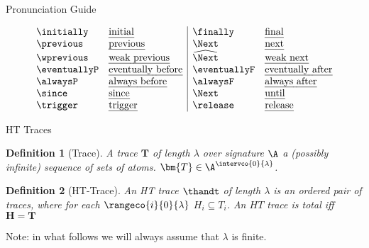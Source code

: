 \documentclass[aspectratio=169,xcolor=svgnames]{beamer}
\theoremstyle{theoremstyle_space}
\newtheorem{definition}{Definition}
\begin{document}
\begin{frame}[t]{Pronunciation Guide}

\[
  \begin{array}{l l|l l}
    \initially & \text{\emph{initial}} & \finally & \text{\emph{final}}\\
    \previous & \text{\emph{previous}} & \Next & \text{\emph{next}}\\
    \wprevious & \text{\emph{weak previous}} & \wnext & \text{\emph{weak next}}\\
    \eventuallyP & \text{\emph{eventually before}} & \eventuallyF & \text{\emph{eventually after}}\\
    \alwaysP & \text{\emph{always before}} & \alwaysF & \text{\emph{always after}}\\
    \since & \text{\emph{since}} & \Next & \text{\emph{until}}\\
    \trigger & \text{\emph{trigger}} & \release & \text{\emph{release}}
\end{array}
\]

\end{frame}

\begin{frame}[t]{HT Traces}

\begin{definition}[Trace]
  A trace $\bm{T}$ of length $\lambda$ over signature $\A$ a (possibly
  infinite) sequence of sets of atoms.
  $\bm{T} \in \A^{\intervco{0}{\lambda}}$.
\end{definition}

\begin{definition}[HT-Trace]
  An HT trace $\thandt$ of length $\lambda$ is an ordered pair of
  traces, where for each $\rangeco{i}{0}{\lambda}$
  $H_i \subseteq T_i$. An $HT$ trace is total iff $\bm{H} = \bm{T}$
\end{definition}
Note: in what follows we will always assume that $\lambda$ is finite.
\end{frame}
\end{document}
